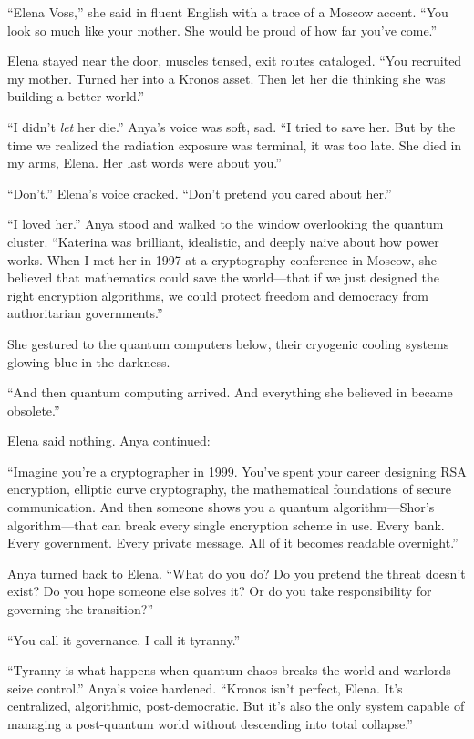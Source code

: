 ``Elena Voss,'' she said in fluent English with a trace of a Moscow accent. ``You look so much like your mother. She would be proud of how far you've come.''

Elena stayed near the door, muscles tensed, exit routes cataloged. ``You recruited my mother. Turned her into a Kronos asset. Then let her die thinking she was building a better world.''

``I didn't \emph{let} her die.'' Anya's voice was soft, sad. ``I tried to save her. But by the time we realized the radiation exposure was terminal, it was too late. She died in my arms, Elena. Her last words were about you.''

``Don't.'' Elena's voice cracked. ``Don't pretend you cared about her.''

``I loved her.'' Anya stood and walked to the window overlooking the quantum cluster. ``Katerina was brilliant, idealistic, and deeply naive about how power works. When I met her in 1997 at a cryptography conference in Moscow, she believed that mathematics could save the world---that if we just designed the right encryption algorithms, we could protect freedom and democracy from authoritarian governments.''

She gestured to the quantum computers below, their cryogenic cooling systems glowing blue in the darkness.

``And then quantum computing arrived. And everything she believed in became obsolete.''

Elena said nothing. Anya continued:

``Imagine you're a cryptographer in 1999. You've spent your career designing RSA encryption, elliptic curve cryptography, the mathematical foundations of secure communication. And then someone shows you a quantum algorithm---Shor's algorithm---that can break every single encryption scheme in use. Every bank. Every government. Every private message. All of it becomes readable overnight.''

Anya turned back to Elena. ``What do you do? Do you pretend the threat doesn't exist? Do you hope someone else solves it? Or do you take responsibility for governing the transition?''

``You call it governance. I call it tyranny.''

``Tyranny is what happens when quantum chaos breaks the world and warlords seize control.'' Anya's voice hardened. ``Kronos isn't perfect, Elena. It's centralized, algorithmic, post-democratic. But it's also the only system capable of managing a post-quantum world without descending into total collapse.''

